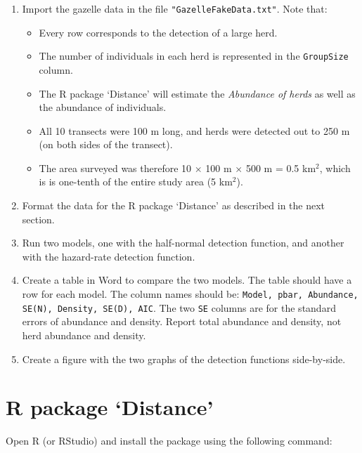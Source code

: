 \documentclass[12pt]{article}\usepackage[]{graphicx}\usepackage[]{color}
\newcommand{\inr}[1]{\colorbox{inlinecolor}{\texttt{#1}}}
\begin{document}
\begin{enumerate}
  \item Import the gazelle data in the file
    \verb+"GazelleFakeData.txt"+. Note that:
    \begin{itemize}
      \item Every row corresponds to the detection of a large herd.
      \item The number of individuals in each herd is represented in
        the \inr{GroupSize} column. 
      \item The R package `Distance' will estimate the
        \textit{Abundance of herds} as well as the abundance of
        individuals.
      \item All 10 transects were 100 m long, and herds were detected
        out to 250 m (on both sides of the transect).
      \item The area surveyed was therefore
        10 $\times$ 100 m $\times$ 500 m = 0.5 km$^2$,
        which is is one-tenth of the entire study area (5 km$^2$).
    \end{itemize}
  \item Format the data for the R package `Distance' as described in
    the next section.  
  \item Run two models, one with the half-normal detection function,
    and another with the hazard-rate detection function.
  \item Create a table in Word to compare the two models. The table
    should have a row for each model. The column names should be:
    \texttt{Model, pbar, Abundance, SE(N), Density, SE(D), AIC}.
    The two \verb+SE+ columns are for the standard errors of
    abundance and density. Report total abundance and density, not
    herd abundance and density.
  \item Create a figure with the two graphs of the detection functions
    side-by-side.
\end{enumerate}



\clearpage




\section*{R package `Distance'}

Open R (or RStudio) and install the package using the following
command:
\end{document}
